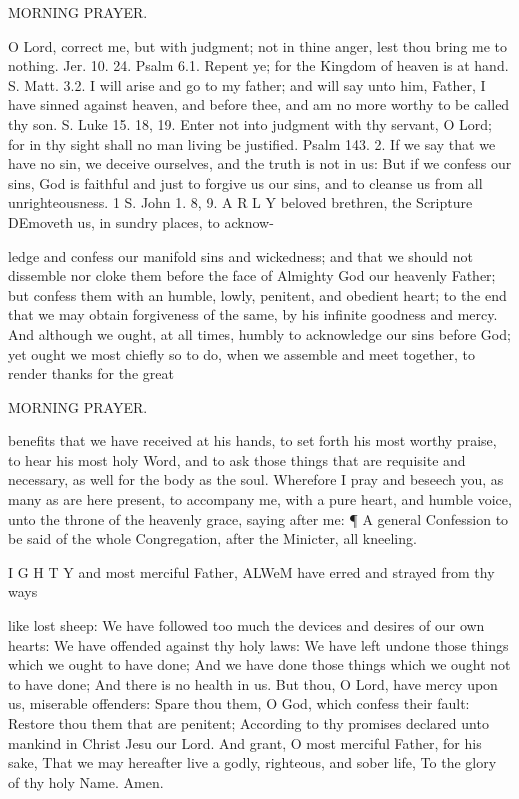 MORNING PRAYER.

O Lord, correct me, but with judgment; not in thine anger, lest thou bring me to nothing. Jer. 10. 24. Psalm 6.1. Repent ye; for the Kingdom of heaven is at hand. S. Matt. 3.2. I will arise and go to my father; and will say unto him, Father, I have sinned against heaven, and before thee, and am no more worthy to be called thy son. S. Luke 15. 18, 19. Enter not into judgment with thy servant, O Lord; for in thy sight shall no man living be justified. Psalm 143. 2. If we say that we have no sin, we deceive ourselves, and the truth is not in us: But if we confess our sins, God is faithful and just to forgive us our sins, and to cleanse us from all unrighteousness. 1 S. John 1. 8, 9. A R L Y beloved brethren, the Scripture DEmoveth us, in sundry places, to acknow-

ledge and confess our manifold sins and wickedness; and that we should not dissemble nor cloke them before the face of Almighty God our heavenly Father; but confess them with an humble, lowly, penitent, and obedient heart; to the end that we may obtain forgiveness of the same, by his infinite goodness and mercy. And although we ought, at all times, humbly to acknowledge our sins before God; yet ought we most chiefly so to do, when we assemble and meet together, to render thanks for the great

MORNING PRAYER.

benefits that we have received at his hands, to set forth his most worthy praise, to hear his most holy Word, and to ask those things that are requisite and necessary, as well for the body as the soul. Wherefore I pray and beseech you, as many as are here present, to accompany me, with a pure heart, and humble voice, unto the throne of the heavenly grace, saying after me: ¶ A general Confession to be said of the whole Congregation, after the Minicter, all kneeling.

I G H T Y and most merciful Father, ALWeM have erred and strayed from thy ways

like lost sheep: We have followed too much the devices and desires of our own hearts: We have offended against thy holy laws: We have left undone those things which we ought to have done; And we have done those things which we ought not to have done; And there is no health in us. But thou, O Lord, have mercy upon us, miserable offenders: Spare thou them, O God, which confess their fault: Restore thou them that are penitent; According to thy promises declared unto mankind in Christ Jesu our Lord. And grant, O most merciful Father, for his sake, That we may hereafter live a godly, righteous, and sober life, To the glory of thy holy Name. Amen.

